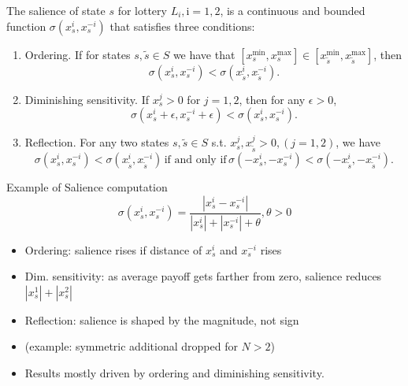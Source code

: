 \begin{frame}\footnotesize
    \begin{definition}
        The salience of state $s$ for lottery $L_i, \mathrm{i}=1,2$, is a continuous and bounded function $\sigma\left(x_s^i, x_s^{-i}\right)$ that satisfies three conditions:\\
        \begin{enumerate}
            \item Ordering. If for states $s, \tilde{s} \in S$ we have that $\left[x_s^{\min }, x_s^{\max }\right] \in \left[x_{\tilde{s}}^{\min }, x_{\tilde{s}}^{\max }\right]$, then
    \[
    \sigma\left(x_s^i, x_s^{-i}\right)<\sigma\left(x_{\tilde{s}}^i, x_{\tilde{s}}^{-i}\right) .
    \]
            \item Diminishing sensitivity. If $x_s^j>0$ for $j=1,2$, then for any $\epsilon>0$,
\[
\sigma\left(x_s^i+\epsilon, x_s^{-i}+\epsilon\right)<\sigma\left(x_s^i, x_s^{-i}\right) .
\]
            \item Reflection. For any two states $s, \tilde{s} \in S$ s.t. $x_s^j, x_{\tilde{s}}^j>0, (j=1,2)$, we have
            \[\sigma\left(x_s^i, x_s^{-i}\right)<\sigma\left(x_{\tilde{s}}^i, x_{\tilde{s}}^{-i}\right)\, \text{if and only if}\, \sigma\left(-x_s^i,-x_s^{-i}\right)<\sigma\left(-x_{\tilde{s}}^i,-x_{\tilde{s}}^{-i}\right).\]
        \end{enumerate}
    \end{definition}
\end{frame}

\begin{frame}{Example of Salience computation}
\[
    \sigma\left(x_s^i, x_s^{-i}\right)=\frac{\left|x_s^i-x_s^{-i}\right|}{\left|x_s^i\right|+\left|x_s^{-i}\right|+\theta}, \theta>0
    \]
    \begin{itemize}
        \item Ordering: salience rises if distance of  $x_s^i$ and $x_s^{-i}$ rises\medskip
        \item Dim. sensitivity: as average payoff gets farther from zero, salience reduces $\left|x_s^1\right|+\left|x_s^2\right|$\medskip
        \item Reflection: salience is shaped by the magnitude, not sign\medskip
        \item (example: symmetric additional dropped for $N>2$)\medskip
        \item Results mostly driven by ordering and diminishing sensitivity.\medskip
	\end{itemize}
\end{frame}

